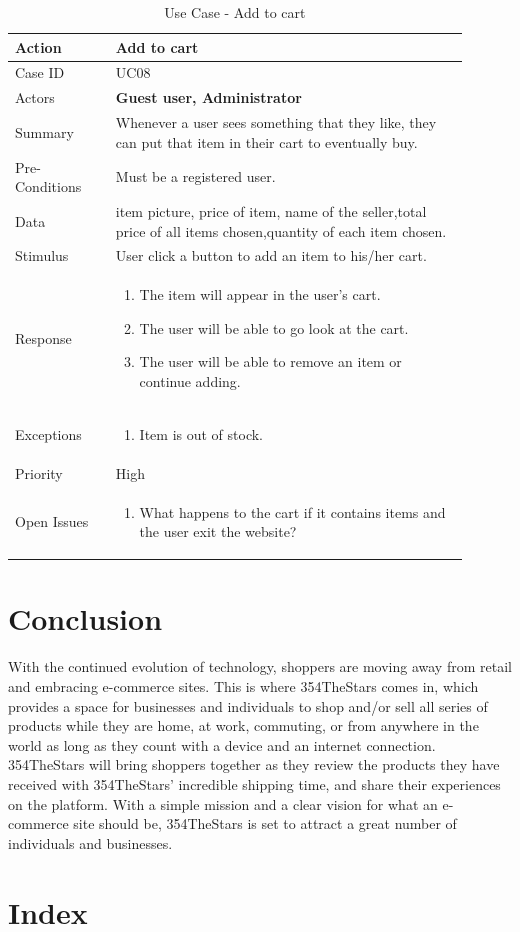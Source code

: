 \documentclass[11pt]{article}
\newcounter{use case ID}
\newcommand\tabularhead[1]{
    \begin{table}[ht]
        \addtocounter{use case ID}{1}
        \caption{Use Case \arabic{use case ID} - #1}
        \vspace{0.2cm}
        \begin{tabular}{|p{0.2\linewidth}|p{0.70\linewidth}|}
            \hline
            \textbf{Action} & \textbf{#1} \\
            \hline}
\newcommand\addrow[2]{#1 & #2\\ \hline}
\newcommand\addmulrow[2]{ \begin{minipage}[t][][t]{2.5cm}#1\end{minipage}
                &\begin{minipage}[t][][t]{11cm}
                    \begin{enumerate}[itemsep=-1ex] #2   \end{enumerate}
                \end{minipage}\vfill\\ \hline}
\newenvironment{usecase}{\tabularhead}
        {\hline\end{tabular}\end{table}}
\begin{document}
\begin{usecase}{Add to cart}
    \addrow{Case ID}{UC08}
    \addrow{Actors}{\textbf{Guest user, Administrator}}
    \addrow{Summary}{Whenever a user sees something that they like, they can put that item in their cart to eventually buy.}
    \addrow{Pre-Conditions}{
       Must be a \index{registered user}registered user.
        }
    \addrow{\index{data}Data}{
item picture, price of item, name of the \index{seller}seller,total price of all items chosen,quantity of each item chosen.}
    \addrow{Stimulus}{User click a button to add an item to his/her cart.}
    \addmulrow{Response}{
        \item The item will appear in the user's cart.
        \item The user will be able to go look at the cart.
        \item The user will be able to remove an item or continue adding.
    }
    \addmulrow{Exceptions}{
        \item Item is out of stock.
    }
    \addrow{Priority}{High}
    \addmulrow{Open Issues}{
        \item What happens to the cart if it contains items and the user exit the website?
    }
\end{usecase}
\clearpage


\section{Conclusion}

With the continued evolution of technology, shoppers are moving away from retail
and embracing e-commerce sites. This is where 354TheStars comes in, which provides
a space for businesses and individuals to shop and/or sell all series of products
while they are home, at work, commuting, or from anywhere in the world as long
as they count with a device and an internet connection. 354TheStars will bring
shoppers together as they review the products they have received with 354TheStars'
incredible shipping time, and share their experiences on the platform. With a
simple mission and a clear vision for what an e-commerce site should be, 354TheStars
is set to attract a great number of individuals and businesses.


\section{Index}

\printindex
\end{document}
